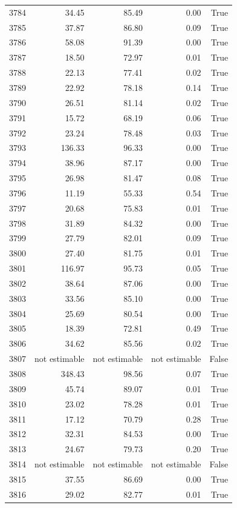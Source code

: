 \begin{longtable}{rrrrr}
3784 & 34.45 & 85.49 & 0.00 & True \\
3785 & 37.87 & 86.80 & 0.09 & True \\
3786 & 58.08 & 91.39 & 0.00 & True \\
3787 & 18.50 & 72.97 & 0.01 & True \\
3788 & 22.13 & 77.41 & 0.02 & True \\
3789 & 22.92 & 78.18 & 0.14 & True \\
3790 & 26.51 & 81.14 & 0.02 & True \\
3791 & 15.72 & 68.19 & 0.06 & True \\
3792 & 23.24 & 78.48 & 0.03 & True \\
3793 & 136.33 & 96.33 & 0.00 & True \\
3794 & 38.96 & 87.17 & 0.00 & True \\
3795 & 26.98 & 81.47 & 0.08 & True \\
3796 & 11.19 & 55.33 & 0.54 & True \\
3797 & 20.68 & 75.83 & 0.01 & True \\
3798 & 31.89 & 84.32 & 0.00 & True \\
3799 & 27.79 & 82.01 & 0.09 & True \\
3800 & 27.40 & 81.75 & 0.01 & True \\
3801 & 116.97 & 95.73 & 0.05 & True \\
3802 & 38.64 & 87.06 & 0.00 & True \\
3803 & 33.56 & 85.10 & 0.00 & True \\
3804 & 25.69 & 80.54 & 0.00 & True \\
3805 & 18.39 & 72.81 & 0.49 & True \\
3806 & 34.62 & 85.56 & 0.02 & True \\
3807 & not estimable & not estimable & not estimable & False \\
3808 & 348.43 & 98.56 & 0.07 & True \\
3809 & 45.74 & 89.07 & 0.01 & True \\
3810 & 23.02 & 78.28 & 0.01 & True \\
3811 & 17.12 & 70.79 & 0.28 & True \\
3812 & 32.31 & 84.53 & 0.00 & True \\
3813 & 24.67 & 79.73 & 0.20 & True \\
3814 & not estimable & not estimable & not estimable & False \\
3815 & 37.55 & 86.69 & 0.00 & True \\
3816 & 29.02 & 82.77 & 0.01 & True \\

\end{longtable}
